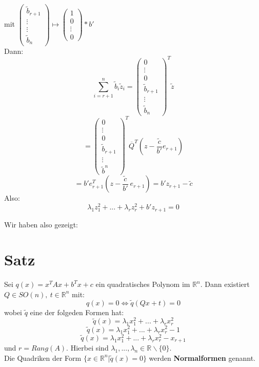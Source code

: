 \documentclass{scrbook}
\begin{document}
\begin{description}
mit $\left(
\begin{array}{c}
\tilde{b}_{r+1}\\ \vdots  \\ \vdots\\ \tilde{b}_n
\end{array}
\right) \mapsto \left(
\begin{array}{c}
1\\0\\ \vdots \\0
\end{array}
\right) *b'$\\
Dann:
\[\sum^n_{i=r+1} \tilde{b}_i \tilde{z}_i = 
\left(
\begin{array}{c}
0\\ \vdots \\0 \\ \tilde{b}_{r+1} \\ \vdots \\ \tilde{b}_n
\end{array}
\right)^T \tilde{z}
\]
\[
= \left(
\begin{array}{c}
0\\ \vdots \\0 \\ \tilde{b}_{r+1} \\ \vdots \\ \tilde{b}^n
\end{array}
\right)^T \overline{Q}^T\left(z-\frac{\tilde{c}}{b'} e_{r+1}\right)
\]
\[
= b' e_{r+1}^T \left(z- \frac{\tilde{c}}{b'}\ e_{r+1}\right) = b' z_{r+1} - \tilde{c}
\]
Also:
\[
\lambda_1 z_1^2 +...+ \lambda_r z_r^2 + b' z_{r+1} = 0
\]
\end{description} 
Wir haben also gezeigt:
\section{Satz}
Sei $q(x) = x^TAx + b^Tx +c$ ein quadratisches Polynom im $\mathbb{R}^n$. Dann existiert $Q \in SO(n),\ t\in \mathbb{R}^n$ mit:
\[
q(x) = 0 \Leftrightarrow \tilde{q}(Qx + t) = 0
\]
wobei $\tilde{q}$ eine der folgeden Formen hat:
\[
\tilde{q}(x) = \lambda_1 x_1^2 + ... + \lambda_r x_r^2
\]
\[
\tilde{q}(x) = \lambda_1 x_1^2 + ... + \lambda_r x_r^2-1
\]
\[
\tilde{q}(x) = \lambda_1 x_1^2 + ... + \lambda_r x_r^2-x_{r+1}
\]
und $r = Rang(A)$. Hierbei sind $\lambda_1,...,\lambda_n \in \mathbb{R} \backslash \{0\}$.\\
Die Quadriken der Form $\{x \in \mathbb{R}^n|\tilde{q}(x)=0\}$ werden \textbf{Normalformen} genannt.
\end{document}
